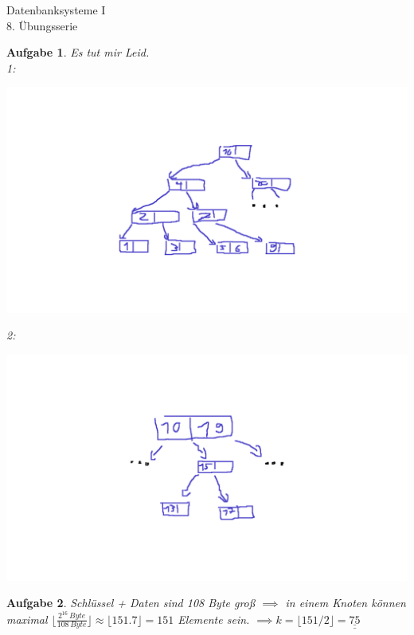 \documentclass[11pt]{article}
\theoremstyle{break}
\newtheorem{task}{Aufgabe}
\begin{document}
\begin{center}
\Large{Datenbanksysteme I}\\
\large{8. Übungsserie}
\end{center}
\begin{task}
	Es tut mir Leid.\\
	1:\vspace{-3cm}
	\begin{center}
	\includegraphics[scale=1]{"files/tree_1"}
	\end{center}
	2:\vspace{-3cm}
	\begin{center}
	\includegraphics[scale=1]{"files/tree_2"}
	\end{center}
\end{task}

\begin{task}
	Schlüssel + Daten sind 108 Byte groß $\implies$ in einem Knoten können maximal $\lfloor\frac{2^{16}\,Byte}{108\,Byte}\rfloor \approx	 \lfloor 151.7 \rfloor = 151$ Elemente sein. $\implies k = \lfloor 151/2 \rfloor = \underline{\underline{75}}$ 
\end{task}
\end{document}

